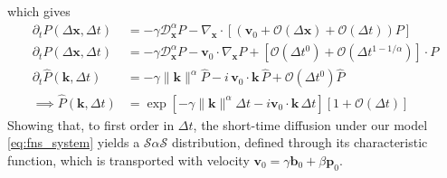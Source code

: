 which gives
\begin{align}
	\nonumber
    \partial_t P(\Delta \textbf{x},\Delta t) &= -\gamma\mathcal{D}^{\alpha}_\textbf{x}P -\nabla_{\mathbf{x}}\cdot
    \left[\left(\textbf{v}_0 + \mathcal{O}(\Delta \textbf{x}) + \mathcal{O}(\Delta t)\right)P\right]\\
    \nonumber
    \partial_t P(\Delta \textbf{x},\Delta t) &= -\gamma\mathcal{D}^{\alpha}_\textbf{x}P - \mathbf{v}_0\cdot\nabla_{\mathbf{x}}P +  \left[\mathcal{O}(\Delta t^0) + \mathcal{O}(\Delta t^{1 - 1/\alpha})\right] \cdot P\\
    \partial_t \hat P(\mathbf{k},\Delta t) &= -\gamma\|\mathbf{k}\|^{\alpha}\hat P - i\,\mathbf{v}_0\cdot\mathbf{k}\,\hat P + \mathcal{O}(\Delta t^0) \hat{P}\\
    \implies \hat P(\mathbf{k},\Delta t) &= \exp\left[-\gamma\|\mathbf{k}\|^{\alpha}\Delta t - i\mathbf{v}_0\cdot\mathbf{k}\,\Delta t\right] [1 + \mathcal{O}(\Delta t)] \label{eq:characteristic_equation}
\end{align}
Showing that, to first order in $\Delta t$, the short-time diffusion under our model \cref{eq:fns_system} yields a $\mathcal{S}\alpha\mathcal{S}$ distribution, defined through its characteristic function, which is transported with velocity  $\mathbf{v}_0 = \gamma \textbf{b}_0 + \beta \textbf{p}_0$.

